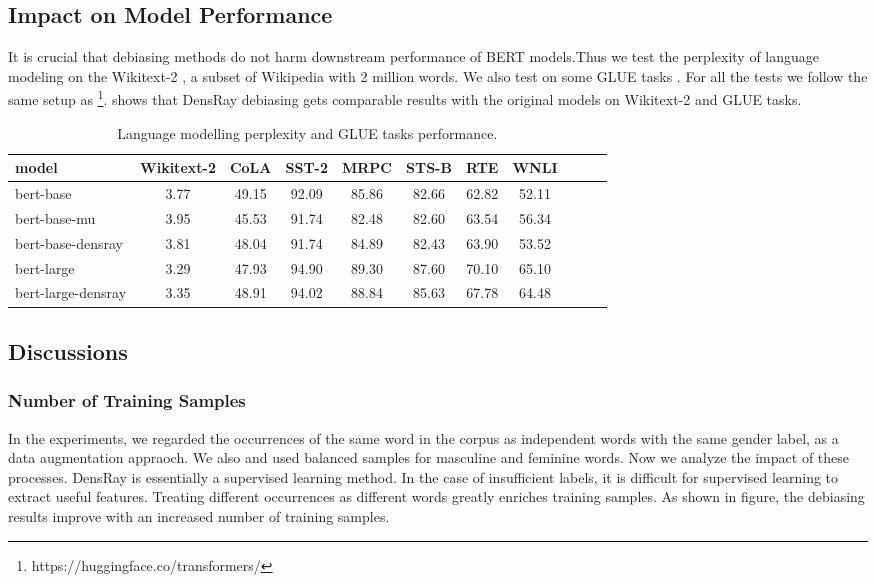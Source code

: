 \subsection{Impact on Model Performance}
It is crucial that debiasing methods do not harm downstream performance of BERT models.Thus we test the perplexity of language modeling on the Wikitext-2 \citep{merity2016pointer}, a subset of Wikipedia with 2 million words. We also test on some GLUE tasks \citep{wang2018glue}. For all the tests we follow the same setup as \citet{wolf2019huggingfaces}\footnote{https://huggingface.co/transformers/}.  shows that DensRay debiasing gets comparable results with the original models on Wikitext-2 and GLUE tasks.
\begin{table}[ht]
\centering
\footnotesize
\begin{tabular}{lcccccccccc}
\hline
model & Wikitext-2&CoLA &SST-2&MRPC&STS-B&RTE&WNLI\\
\hline
bert-base &3.77&49.15&92.09&85.86&82.66&62.82&52.11\\
bert-base-mu &3.95&45.53&91.74&82.48&82.60&63.54&56.34\\
bert-base-densray &3.81&48.04&91.74&84.89&82.43&63.90&53.52\\
\hline
bert-large &3.29& 47.93&94.90&89.30&87.60&70.10&65.10\\
bert-large-densray &3.35& 48.91&94.02&88.84&85.63&67.78&64.48\\
\hline
\end{tabular}
\caption{
Language modelling perplexity and GLUE tasks performance.}
\end{table}
\subsection{Discussions}
\subsubsection{Number of Training Samples}
In the experiments, we regarded the occurrences of the same word in the corpus as independent words with the same gender label, as a data augmentation appraoch. We also and used balanced samples for masculine and feminine words. Now we analyze the impact of these processes.
DensRay is essentially a supervised learning method. In the case of insufficient labels, it is difficult for supervised learning to extract useful features. Treating different occurrences as different words greatly enriches training samples. As shown in figure, the debiasing results improve with an increased number of training samples.

